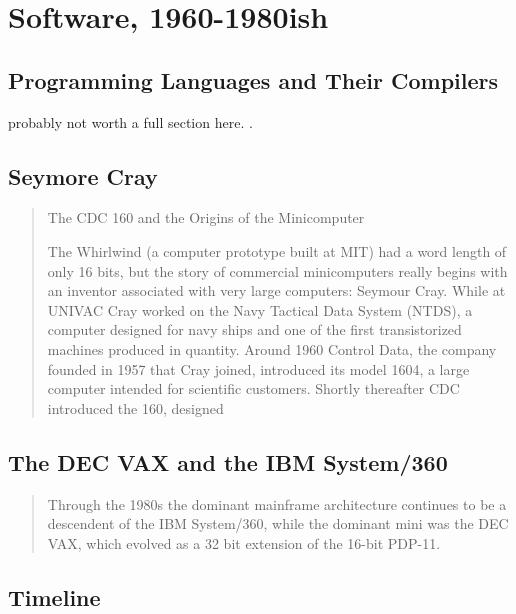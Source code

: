 
\chapter{Software, 1960-1980ish}
\label{chap:software}









\section{Programming Languages and Their Compilers}

probably not worth a full section here.
.

\section{Seymore Cray}
\begin{quotation}
	The CDC 160 and the Origins of the Minicomputer

	The Whirlwind (a computer prototype built at
	MIT) had a word length of only 16 bits, but the story of commercial minicomputers really begins with
	an inventor associated with very large computers: Seymour Cray. While at UNIVAC Cray worked on the
	Navy Tactical Data System (NTDS), a computer designed for navy ships and one of the first
	transistorized machines produced in quantity. Around 1960 Control Data, the company founded in 1957
	that Cray joined, introduced its model 1604, a large computer intended for scientific customers.
	Shortly thereafter CDC introduced the 160, designed
	\cite{nothing_new_since_von_neumann_2000}
\end{quotation}

\section{The DEC VAX and the IBM System/360}
\begin{quotation}
	Through the 1980s the dominant mainframe architecture continues to be a descendent of the IBM
	System/360, while the dominant mini was the DEC VAX, which evolved as a 32 bit extension of the
	16-bit PDP-11.
	\cite{nothing_new_since_von_neumann_2000}
\end{quotation}



\pagebreak
\section{Timeline}

